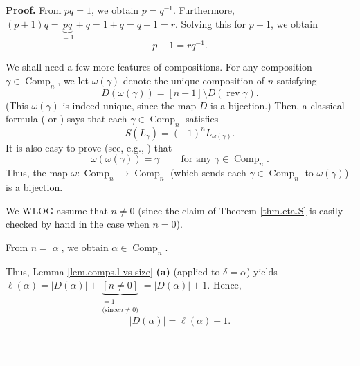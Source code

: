 \documentclass[numbers=enddot,12pt,final,onecolumn,notitlepage]{scrartcl}%
\theoremstyle{definition}
\newenvironment{proof}[1][Proof]{\noindent\textbf{#1.} }{\ \rule{0.5em}{0.5em}}
\newenvironment{noncompile}{}{}
\begin{document}
\begin{proof}
From $pq=1$, we obtain $p=q^{-1}$. Furthermore, $\left(  p+1\right)
q=\underbrace{pq}_{=1}+q=1+q=q+1=r$. Solving this for $p+1$, we obtain%
\begin{equation}
p+1=rq^{-1}. \label{pf.prop.eta.S.r=}%
\end{equation}


We shall need a few more features of compositions. For any composition
$\gamma\in\operatorname*{Comp}\nolimits_{n}$, we let $\omega\left(
\gamma\right)  $ denote the unique composition of $n$ satisfying%
\begin{equation}
D\left(  \omega\left(  \gamma\right)  \right)  =\left[  n-1\right]  \setminus
D\left(  \operatorname*{rev}\gamma\right)  . \label{pf.prop.eta.S.Domgam}%
\end{equation}
(This $\omega\left(  \gamma\right)  $ is indeed unique, since the map $D$ is a
bijection.) Then, a classical formula (\cite[(4.27)]{Malven93} or
\cite[(5.2.7)]{GriRei}) says that each $\gamma\in\operatorname*{Comp}%
\nolimits_{n}$ satisfies%
\begin{equation}
S\left(  L_{\gamma}\right)  =\left(  -1\right)  ^{n}L_{\omega\left(
\gamma\right)  }. \label{pf.prop.eta.S.SLgam}%
\end{equation}
It is also easy to prove (see, e.g., \cite[Proposition 4.3 \textbf{(d)}%
]{comps}) that%
\begin{equation}
\omega\left(  \omega\left(  \gamma\right)  \right)  =\gamma
\ \ \ \ \ \ \ \ \ \ \text{for any }\gamma\in\operatorname*{Comp}\nolimits_{n}.
\label{pf.prop.eta.S.oo=id}%
\end{equation}
Thus, the map $\omega:\operatorname*{Comp}\nolimits_{n}\rightarrow
\operatorname*{Comp}\nolimits_{n}$ (which sends each $\gamma\in
\operatorname*{Comp}\nolimits_{n}$ to $\omega\left(  \gamma\right)  $) is a bijection.

We WLOG assume that $n\neq0$ (since the claim of Theorem \ref{thm.eta.S} is
easily checked by hand in the case when $n=0$).

From $n=\left\vert \alpha\right\vert $, we obtain $\alpha\in
\operatorname*{Comp}\nolimits_{n}$.

\begin{noncompile}
Thus, Lemma \ref{lem.comps.l-vs-size} \textbf{(a)} (applied to $\delta=\alpha
$) yields $\ell\left(  \alpha\right)  =\left\vert D\left(  \alpha\right)
\right\vert +\underbrace{\left[  n\neq0\right]  }_{\substack{=1\\\text{(since
}n\neq0\text{)}}}=\left\vert D\left(  \alpha\right)  \right\vert +1$. Hence,%
\begin{equation}
\left\vert D\left(  \alpha\right)  \right\vert =\ell\left(  \alpha\right)  -1.
\label{pf.prop.eta.S.Da}%
\end{equation}


\end{noncompile}
\end{proof}
\end{document}
